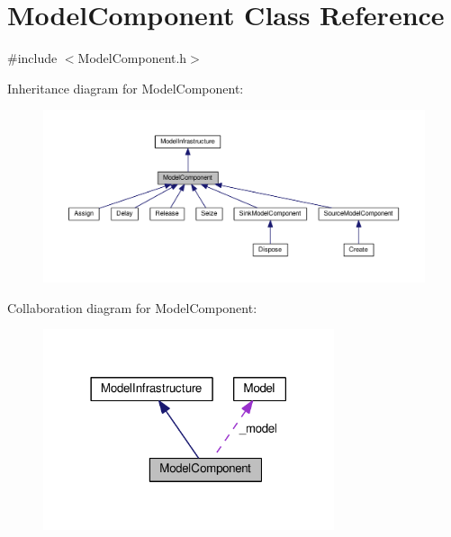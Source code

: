 \hypertarget{class_model_component}{}\section{Model\+Component Class Reference}
\label{class_model_component}


{\ttfamily \#include $<$Model\+Component.\+h$>$}



Inheritance diagram for Model\+Component\+:
\nopagebreak
\begin{figure}[H]
\begin{center}
\leavevmode
\includegraphics[width=350pt]{class_model_component__inherit__graph}
\end{center}
\end{figure}


Collaboration diagram for Model\+Component\+:
\nopagebreak
\begin{figure}[H]
\begin{center}
\leavevmode
\includegraphics[width=242pt]{class_model_component__coll__graph}
\end{center}
\end{figure}

